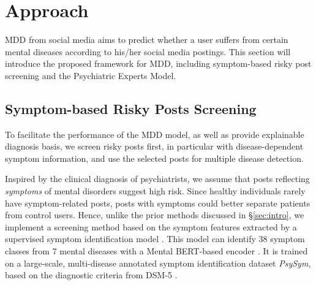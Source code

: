 \section{Approach}
MDD from social media aims to predict whether a user suffers from certain mental diseases according to his/her social media postings. 
This section will introduce the proposed framework for MDD, including symptom-based risky post screening and the Psychiatric Experts Model.

\subsection{Symptom-based Risky Posts Screening}
\label{sec:symp_screen}

To facilitate the performance of the MDD model, as well as provide explainable diagnosis basis, we screen risky posts first, in particular with disease-dependent symptom information, and use the selected posts for multiple disease detection. 

Inspired by the clinical diagnosis of psychiatrists, we assume that posts reflecting \textit{symptoms} of mental disorders suggest high risk. Since healthy individuals rarely have symptom-related posts, posts with symptoms could better separate patients from control users. Hence, unlike the prior methods discussed in \S \ref{sec:intro}, we implement a screening method based on the symptom features extracted by a supervised symptom identification model \cite{Zhang2022SymptomIF}.
This model can identify 38 symptom classes from 7 mental diseases with a Mental BERT-based encoder \cite{ji2021mentalbert}. It is trained on a large-scale, multi-disease annotated symptom identification dataset \textit{PsySym}, based on the diagnostic criteria from DSM-5 \cite{american2013diagnostic}. 

